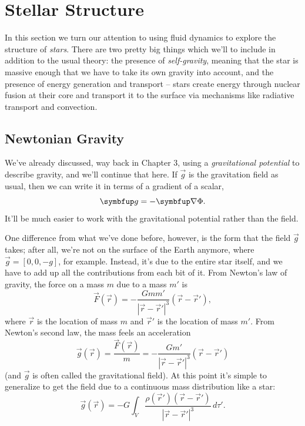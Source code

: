 %
% 

\section{Stellar Structure}

In this section we turn our attention to using fluid dynamics to explore the structure of \emph{stars}.  There are two pretty big things which we'll to include in addition to the usual theory:  the presence of \emph{self-gravity}, meaning that the star is massive enough that we have to take its own gravity into account, and the presence of energy generation and transport -- stars create energy through nuclear fusion at their core and transport it to the surface via mechanisms like radiative transport and convection.

\subsection{Newtonian Gravity}

We've already discussed, way back in Chapter 3, using a \emph{gravitational potential} to describe gravity, and we'll continue that here.  If $\vec{g}$ is the gravitation field as usual, then we can write it in terms of a gradient of a scalar,
\begin{equation}
\vec{g} = -\grad \Phi.
\end{equation}
It'll be much easier to work with the gravitational potential rather than the field.  

One difference from what we've done before, however, is the form that the field $\vec{g}$ takes; after all, we're not on the surface of the Earth anymore, where $\vec{g} = [0, 0, -g]$, for example.  Instead, it's due to the entire star itself, and we have to add up all the contributions from each bit of it.  From Newton's law of gravity, the force on a mass $m$ due to a mass $m'$ is 
\[
\vec{F}(\vec{r}) = -\frac{G m m'}{|\vec{r} - \vec{r}'|^3} (\vec{r} - \vec{r}'),
\]
where $\vec{r}$ is the location of mass $m$ and $\vec{r}'$ is the location of mass $m'$.  From Newton's second law, the mass feels an acceleration
\[
\vec{g}(\vec{r}) = \frac{\vec{F}(\vec{r})}{m} = -\frac{G m'}{|\vec{r} - \vec{r}'|^3} (\vec{r} - \vec{r}')
\]
(and $\vec{g}$ is often called the gravitational field).  At this point it's simple to generalize to get the field due to a continuous mass distribution like a star:
\begin{equation}
\vec{g}(\vec{r}) = -G \int_V \frac{ \rho(\vec{r}') (\vec{r} - \vec{r}')}{|\vec{r} - \vec{r}'|^3} \, d\tau'.
\end{equation}

